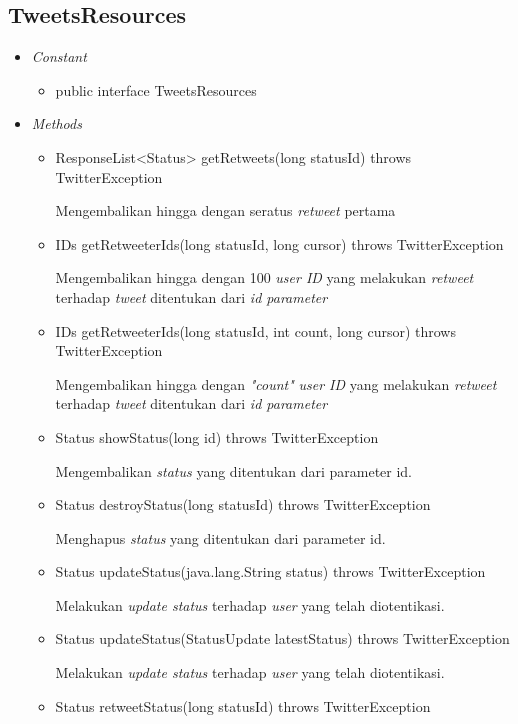 	\subsection{TweetsResources}
	\begin{itemize}
		\item \textit{Constant}
		
		\begin{itemize}
			\item public interface TweetsResources
						
		\end{itemize}
		\item \textit{Methods}
		
		\begin{itemize}
			\item ResponseList<Status> getRetweets(long statusId) throws TwitterException
			
			Mengembalikan hingga dengan seratus \textit{retweet} pertama
			\item IDs getRetweeterIds(long statusId, long cursor) throws TwitterException
			
			Mengembalikan hingga dengan 100 \textit{user ID} yang melakukan \textit{retweet} terhadap \textit{tweet} ditentukan dari \textit{id parameter}
			\item IDs getRetweeterIds(long statusId, int count, long cursor) throws TwitterException
			
			Mengembalikan hingga dengan \textit{"count"} \textit{user ID} yang melakukan \textit{retweet} terhadap \textit{tweet} ditentukan dari \textit{id parameter}
			\item Status showStatus(long id) throws TwitterException
			
			Mengembalikan \textit{status} yang ditentukan dari parameter id.
			\item Status destroyStatus(long statusId) throws TwitterException
			
			Menghapus \textit{status} yang ditentukan dari parameter id.
			\item Status updateStatus(java.lang.String status) throws TwitterException
			
			Melakukan \textit{update status} terhadap \textit{user} yang telah diotentikasi.
			\item Status updateStatus(StatusUpdate latestStatus) throws TwitterException
			
			Melakukan \textit{update status} terhadap \textit{user} yang telah diotentikasi.
			\item Status retweetStatus(long statusId) throws TwitterException
			

\end{itemize}
\end{itemize}
